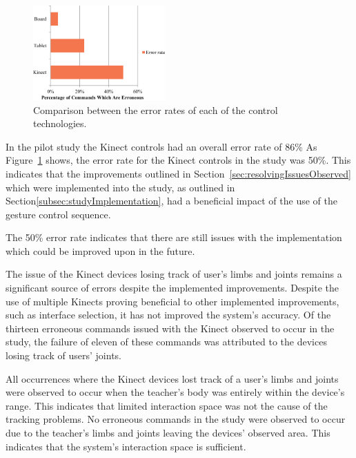\documentclass[link]{IWCOMP}
\begin{document}
\begin{figure}[h]
   \centering
   \includegraphics[width=0.45\textwidth]{figures/bar_chart_errors.png}
   \caption{Comparison between the error rates of each of the control technologies.}
   \label{fig:controlDevicesErrors}
 \end{figure}

In the pilot study the Kinect controls had an overall error rate of 86\%
As Figure~\ref{fig:controlDevicesErrors} shows, the error rate for the Kinect controls in the study was 50\%.
This indicates that the improvements outlined in Section~\ref{sec:resolvingIssuesObserved} which were implemented into the study, as outlined in Section\ref{subsec:studyImplementation}, had a beneficial impact of the use of the gesture control sequence.

The 50\% error rate indicates that there are still issues with the implementation which could be improved upon in the future.


The issue of the Kinect devices losing track of user's limbs and joints remains a significant source of errors despite the implemented improvements.
Despite the use of multiple Kinects proving beneficial to other implemented improvements, such as interface selection, it has not improved the system's accuracy.
Of the thirteen erroneous commands issued with the Kinect observed to occur in the study, the failure of eleven of these commands was attributed to the devices losing track of users' joints.

All occurrences where the Kinect devices lost track of a user's limbs and joints were observed to occur when the teacher's body was entirely within the device's range.
This indicates that limited interaction space was not the cause of the tracking problems.
No erroneous commands in the study were observed to occur due to the teacher's limbs and joints leaving the devices' observed area.
This indicates that the system's interaction space is sufficient.
\end{document}
